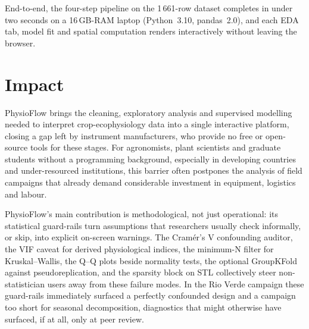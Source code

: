 \documentclass[preprint,12pt,a4paper]{elsarticle}
\begin{document}
End-to-end, the four-step pipeline on the 1\,661-row dataset completes in under two seconds on a 16\,GB-RAM laptop (Python~3.10, pandas~2.0), and each EDA tab, model fit and spatial computation renders interactively without leaving the browser.

\section{Impact}\label{sec:impact}

PhysioFlow brings the cleaning, exploratory analysis and supervised modelling needed to interpret crop-ecophysiology data into a single interactive platform, closing a gap left by instrument manufacturers, who provide no free or open-source tools for these stages. For agronomists, plant scientists and graduate students without a programming background, especially in developing countries and under-resourced institutions, this barrier often postpones the analysis of field campaigns that already demand considerable investment in equipment, logistics and labour.

PhysioFlow's main contribution is methodological, not just operational: its statistical guard-rails turn assumptions that researchers usually check informally, or skip, into explicit on-screen warnings. The Cram\'er's V confounding auditor, the VIF caveat for derived physiological indices, the minimum-N filter for Kruskal--Wallis, the Q--Q plots beside normality tests, the optional GroupKFold against pseudoreplication, and the sparsity block on STL collectively steer non-statistician users away from these failure modes. In the Rio Verde campaign these guard-rails immediately surfaced a perfectly confounded design and a campaign too short for seasonal decomposition, diagnostics that might otherwise have surfaced, if at all, only at peer review.
\end{document}
